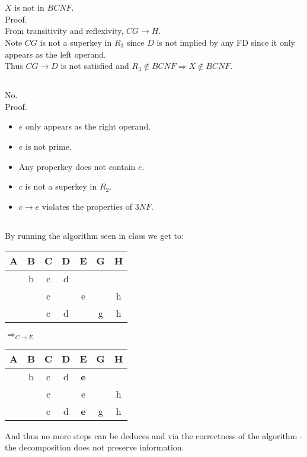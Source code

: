 \section{}
\subsection{}
$X$ is not in $BCNF$.\\
Proof.\\
From transitivity and reflexivity, $CG\rightarrow H$.\\
Note $CG$ is not a superkey in $R_3$ since $D$ is not implied
by any FD since it only appears as the left operand.\\
Thus $CG \rightarrow D$ is not satisfied and $R_3\notin BCNF \Rightarrow X\notin BCNF$.

\subsection{}
No.\\
Proof.
\begin{itemize}
	\item $e$ only appears as the right operand.
	\item $e$ is not prime.
	\item Any properkey does not contain $e$.
	\item $c$ is not a superkey in $R_2$.
	\item $c\rightarrow e$ violates the properties of $3NF$.
\end{itemize}

\subsection{}
By running the algorithm seen in class we get to:
\begin{center}
	\begin{tabular}{| c | c | c | c | c | c | c |}
		\hline
		A	&B	&C	&D	&E	&G	&H	\\
		\hline
			&b	&c	&d	&	&	&	\\
		\hline
			&	&c	&	&e	&	&h	\\
		\hline
			&	&c	&d	&	&g	&h	\\
		\hline
	\end{tabular}
	$\Longrightarrow_{C\rightarrow E}$
	\begin{tabular}{| c | c | c | c | c | c | c |}
		\hline
		A	&B	&C	&D	&E			&G	&H	\\
		\hline
			&b	&c	&d	&\textbf{e}	&	&	\\
		\hline
			&	&c	&	&e			&	&h	\\
		\hline
			&	&c	&d	&\textbf{e}	&g	&h	\\
		\hline
	\end{tabular}
\end{center}
And thus no more steps can be deduces and via the correctness of the algorithm -
the decomposition does not preserve information.

